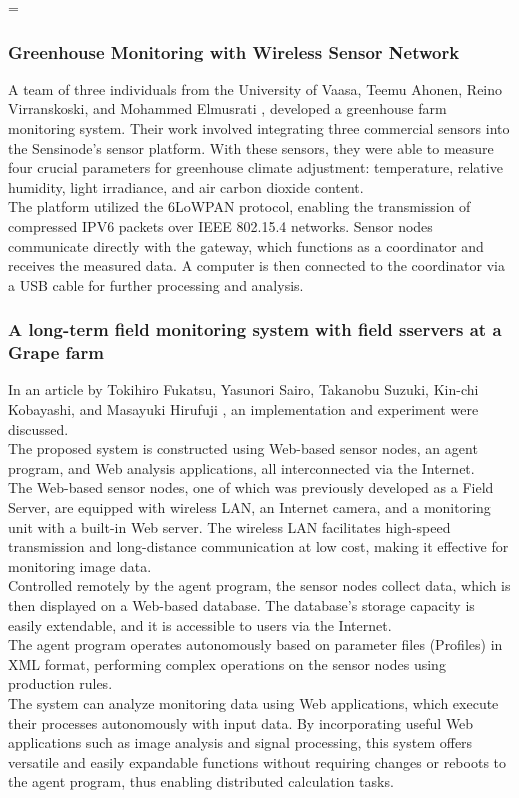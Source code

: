 =\documentclass[12pt, a4paper]{article}
\begin{document}
\subsubsection{Greenhouse Monitoring with Wireless Sensor Network}
A team of three individuals from the University of Vaasa, Teemu Ahonen, Reino Virranskoski, and Mohammed Elmusrati \cite{torabi2023greenhouse}, developed a greenhouse farm monitoring system. Their work involved integrating three commercial sensors into the Sensinode's sensor platform. With these sensors, they were able to measure four crucial parameters for greenhouse climate adjustment: temperature, relative humidity, light irradiance, and air carbon dioxide content.\\
The platform utilized the 6LoWPAN protocol, enabling the transmission of compressed IPV6 packets over IEEE 802.15.4 networks. Sensor nodes communicate directly with the gateway, which functions as a coordinator and receives the measured data. A computer is then connected to the coordinator via a USB cable for further processing and analysis.

\subsubsection{A long-term field monitoring system with field sservers at a Grape farm}
In an article by Tokihiro Fukatsu, Yasunori Sairo, Takanobu Suzuki, Kin-chi Kobayashi, and Masayuki Hirufuji \cite{saito2008long}, an implementation and experiment were discussed.\\
The proposed system is constructed using Web-based sensor nodes, an agent program, and Web analysis applications, all interconnected via the Internet.\\
The Web-based sensor nodes, one of which was previously developed as a Field Server, are equipped with wireless LAN, an Internet camera, and a monitoring unit with a built-in Web server. The wireless LAN facilitates high-speed transmission and long-distance communication at low cost, making it effective for monitoring image data.\\
Controlled remotely by the agent program, the sensor nodes collect data, which is then displayed on a Web-based database. The database's storage capacity is easily extendable, and it is accessible to users via the Internet.\\
The agent program operates autonomously based on parameter files (Profiles) in XML format, performing complex operations on the sensor nodes using production rules.\\
The system can analyze monitoring data using Web applications, which execute their processes autonomously with input data. By incorporating useful Web applications such as image analysis and signal processing, this system offers versatile and easily expandable functions without requiring changes or reboots to the agent program, thus enabling distributed calculation tasks.
\end{document}
